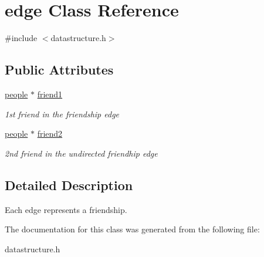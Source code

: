 \hypertarget{classedge}{\section{edge \-Class \-Reference}
\label{classedge}
}


{\ttfamily \#include $<$datastructure.\-h$>$}

\subsection*{\-Public \-Attributes}
\begin{DoxyCompactItemize}
\item 
\hypertarget{classedge_a6ff5627426d429752c3b9842ca17f923}{\hyperlink{classpeople}{people} $\ast$ \hyperlink{classedge_a6ff5627426d429752c3b9842ca17f923}{friend1}}\label{classedge_a6ff5627426d429752c3b9842ca17f923}

\begin{DoxyCompactList}\small\item\em 1st friend in the friendship edge \end{DoxyCompactList}\item 
\hypertarget{classedge_a9e612c5ea8a97862c2050cf9455e3405}{\hyperlink{classpeople}{people} $\ast$ \hyperlink{classedge_a9e612c5ea8a97862c2050cf9455e3405}{friend2}}\label{classedge_a9e612c5ea8a97862c2050cf9455e3405}

\begin{DoxyCompactList}\small\item\em 2nd friend in the undirected friendhip edge \end{DoxyCompactList}\end{DoxyCompactItemize}


\subsection{\-Detailed \-Description}
\-Each edge represents a friendship. 

\-The documentation for this class was generated from the following file\-:\begin{DoxyCompactItemize}
\item 
datastructure.\-h\end{DoxyCompactItemize}

